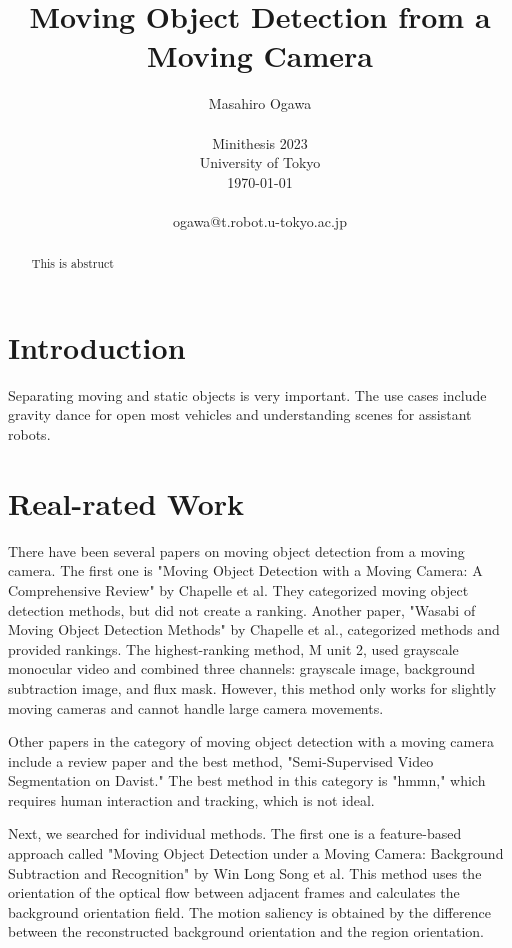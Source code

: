 \documentclass[10pt, twocolumn]{article}
\begin{document}
\title{Moving Object Detection from a Moving Camera}

\author{Masahiro Ogawa \\
  \\
  Minithesis 2023\\
  University of Tokyo\\
  \today
  \\
  \\
  ogawa@t.robot.u-tokyo.ac.jp}

\maketitle
\thispagestyle{empty}

\begin{abstract}
  This is abstruct
\end{abstract}


\section{Introduction}
Separating moving and static objects is very important. The use cases include gravity dance for open most vehicles and understanding scenes for assistant robots.

\section{Real-rated Work}
There have been several papers on moving object detection from a moving camera. The first one is "Moving Object Detection with a Moving Camera: A Comprehensive Review" by Chapelle et al\cite{Mustafa16}. They categorized moving object detection methods, but did not create a ranking. Another paper, "Wasabi of Moving Object Detection Methods" by Chapelle et al., categorized methods and provided rankings. The highest-ranking method, M unit 2, used grayscale monocular video and combined three channels: grayscale image, background subtraction image, and flux mask. However, this method only works for slightly moving cameras and cannot handle large camera movements.

Other papers in the category of moving object detection with a moving camera include a review paper and the best method, "Semi-Supervised Video Segmentation on Davist." The best method in this category is "hmmn," which requires human interaction and tracking, which is not ideal.

Next, we searched for individual methods. The first one is a feature-based approach called "Moving Object Detection under a Moving Camera: Background Subtraction and Recognition" by Win Long Song et al. This method uses the orientation of the optical flow between adjacent frames and calculates the background orientation field. The motion saliency is obtained by the difference between the reconstructed background orientation and the region orientation.
\end{document}
